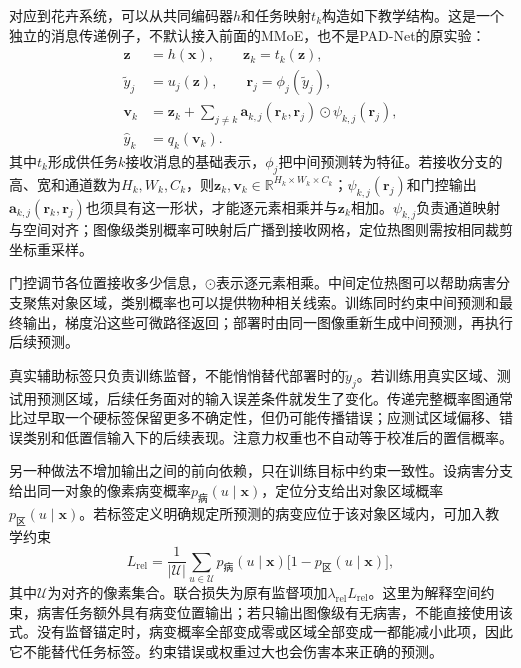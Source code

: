 对应到花卉系统，可以从共同编码器$h$和任务映射$t_k$构造如下教学结构。这是一个独立的消息传递例子，不默认接入前面的MMoE，也不是PAD-Net的原实验：
\begin{align}
  \bm z&=h(\bm x),
  \qquad \bm z_k=t_k(\bm z),
  \nonumber\\
  \widetilde y_j&=u_j(\bm z),
  \qquad
  \bm r_j=\phi_j(\widetilde y_j),
  \nonumber\\
  \bm v_k&=\bm z_k+
     \sum_{j\ne k}
     \bm a_{k,j}(\bm r_k,\bm r_j)
       \odot\psi_{k,j}(\bm r_j),
  \nonumber\\
  \hat y_k&=q_k(\bm v_k).
  \label{eq:ket-sharing-output-message}
\end{align}
其中$t_k$形成供任务$k$接收消息的基础表示，$\phi_j$把中间预测转为特征。若接收分支的高、宽和通道数为$H_k,W_k,C_k$，则$\bm z_k,\bm v_k\in\mathbb R^{H_k\times W_k\times C_k}$；$\psi_{k,j}(\bm r_j)$和门控输出$\bm a_{k,j}(\bm r_k,\bm r_j)$也须具有这一形状，才能逐元素相乘并与$\bm z_k$相加。$\psi_{k,j}$负责通道映射与空间对齐；图像级类别概率可映射后广播到接收网格，定位热图则需按相同裁剪坐标重采样。

门控调节各位置接收多少信息，$\odot$表示逐元素相乘。中间定位热图可以帮助病害分支聚焦对象区域，类别概率也可以提供物种相关线索。训练同时约束中间预测和最终输出，梯度沿这些可微路径返回；部署时由同一图像重新生成中间预测，再执行后续预测。

真实辅助标签只负责训练监督，不能悄悄替代部署时的$\widetilde y_j$。若训练用真实区域、测试用预测区域，后续任务面对的输入误差条件就发生了变化。传递完整概率图通常比过早取一个硬标签保留更多不确定性，但仍可能传播错误；应测试区域偏移、错误类别和低置信输入下的后续表现。注意力权重也不自动等于校准后的置信概率。

另一种做法不增加输出之间的前向依赖，只在训练目标中约束一致性。设病害分支给出同一对象的像素病变概率$p_{\text{病}}(u\mid\bm x)$，定位分支给出对象区域概率$p_{\text{区}}(u\mid\bm x)$。若标签定义明确规定所预测的病变应位于该对象区域内，可加入教学约束
\begin{equation}
  L_{\mathrm{rel}}
  =\frac{1}{|\mathcal U|}
    \sum_{u\in\mathcal U}
    p_{\text{病}}(u\mid\bm x)
    \bigl[1-p_{\text{区}}(u\mid\bm x)\bigr],
  \label{eq:ket-sharing-output-constraint}
\end{equation}
其中$\mathcal U$为对齐的像素集合。联合损失为原有监督项加$\lambda_{\mathrm{rel}}L_{\mathrm{rel}}$。这里为解释空间约束，病害任务额外具有病变位置输出；若只输出图像级有无病害，不能直接使用该式。没有监督锚定时，病变概率全部变成零或区域全部变成一都能减小此项，因此它不能替代任务标签。约束错误或权重过大也会伤害本来正确的预测。

